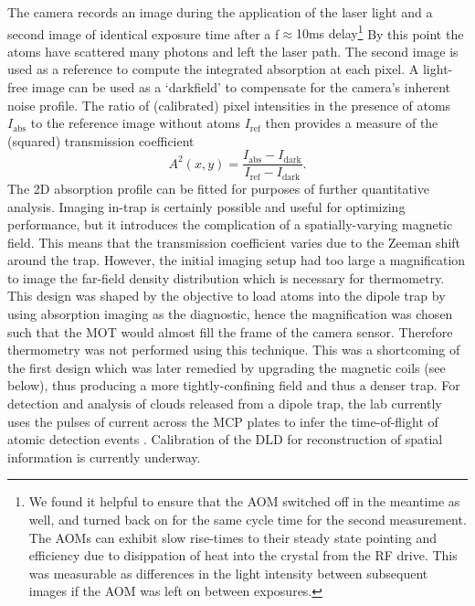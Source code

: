 	The camera records an image during the application of the laser light and a second image of identical exposure time after a f{$\approx$10ms delay}\footnote{We found it helpful to ensure that the AOM switched off in the meantime as well, and turned back on for the same cycle time for the second measurement.
	The AOMs can exhibit slow rise-times to their steady state pointing and efficiency due to disippation of heat into the crystal from the RF drive.
	This was measurable as differences in the light intensity between subsequent images if the AOM was left on between exposures.}
	By this point the atoms have scattered many photons and left the laser path.
	The second image is used as a reference to compute the integrated absorption at each pixel.
	A light-free image can be used as a `darkfield' to compensate for the camera's inherent noise profile.
	The ratio of (calibrated) pixel intensities in the presence of atoms $I_\textrm{abs}$ to the reference image without atoms $I_\textrm{ref}$ then provides a measure of the (squared) transmission coefficient
	\begin{equation}
	A^2(x,y)=\frac{I_\textrm{abs}-I_\textrm{dark}}{I_\textrm{ref}-I_\textrm{dark}}.
	\end{equation}
	The 2D absorption profile can be fitted for purposes of further quantitative analysis. 
	Imaging in-trap is certainly possible and useful for optimizing performance, but it introduces the complication of a spatially-varying magnetic field.
	This means that the transmission coefficient varies due to the Zeeman shift around the trap.
	However, the initial imaging setup had too large a magnification to image the far-field density distribution which is necessary for thermometry.
	This design was shaped by the objective to load atoms into the dipole trap by using absorption imaging as the diagnostic, hence the magnification was chosen such that the MOT would almost fill the frame of the camera sensor.
	Therefore thermometry was not performed using this technique. 
	This was a shortcoming of the first design which was later remedied by upgrading the magnetic coils (see below), thus producing a more tightly-confining field and thus a denser trap.
	For detection and analysis of clouds released from a dipole trap, the lab currently uses the pulses of current across the MCP plates to infer the time-of-flight of atomic detection events \cite{Abbas21}.
	Calibration of the DLD for reconstruction of spatial information is currently underway.

